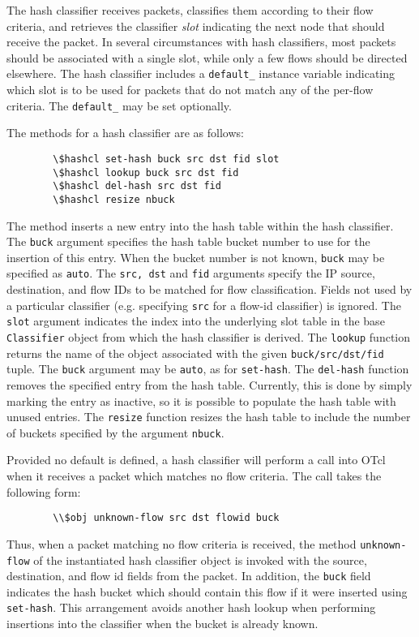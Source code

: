 The hash classifier receives packets, classifies them according
to their flow criteria, and retrieves the classifier {\em slot}
indicating the next node that should receive the packet.
In several circumstances with hash classifiers, most packets should
be associated with a single slot, while only a few flows should
be directed elsewhere. 
The hash classifier includes a {\tt default\_} instance variable
indicating which slot is to be used for packets that do not match
any of the per-flow criteria.
The {\tt default\_} may be set optionally.

The methods for a hash classifier are as follows:
\begin{verbatim}
        \$hashcl set-hash buck src dst fid slot
        \$hashcl lookup buck src dst fid
        \$hashcl del-hash src dst fid
        \$hashcl resize nbuck
\end{verbatim}

The  method inserts a new entry into the hash
table within the hash classifier.
The {\tt buck} argument specifies the hash table bucket number
to use for the insertion of this entry.
When the bucket number is not known, {\tt buck} may be specified
as {\tt auto}. 
The {\tt src, dst} and {\tt fid} arguments specify the IP source,
destination, and flow IDs to be matched for flow classification.
Fields not used by a particular classifier (e.g. specifying {\tt src}
for a flow-id classifier) is ignored.
The {\tt slot} argument indicates the index into the underlying
slot table in the base {\tt Classifier} object from which
the hash classifier is derived.
The {\tt lookup} function returns the name of the object
associated with the given {\tt buck/src/dst/fid} tuple.
The {\tt buck} argument may be {\tt auto}, as for {\tt set-hash}.
The {\tt del-hash} function removes the specified entry from
the hash table.
Currently, this is done by simply marking the entry as inactive,
so it is possible to populate the hash table with unused entries.
The {\tt resize} function resizes the hash table to include
the number of buckets specified by the argument {\tt nbuck}.

Provided no default is defined, a hash classifier will
perform a call into OTcl when it
receives a packet which matches no flow criteria.
The call takes the following form:
\begin{verbatim}
        \\$obj unknown-flow src dst flowid buck
\end{verbatim} 
Thus, when a packet matching no flow criteria is received,
the method {\tt unknown-flow} of the instantiated hash classifier
object is invoked with the source, destination, and flow id
fields from the packet.
In addition, the {\tt buck} field indicates the hash bucket
which should contain this flow if it were inserted using
{\tt set-hash}.  This arrangement avoids another hash
lookup when performing insertions into the classifier when the
bucket is already known.

